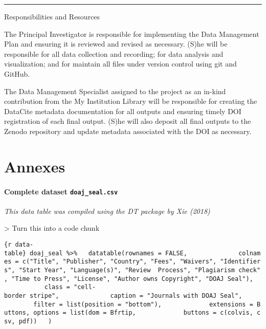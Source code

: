 \documentclass[]{article}
\let\oldparagraph\paragraph
\renewcommand{\paragraph}[1]{\oldparagraph{#1}\mbox{}}
\begin{document}
\begin{center}\rule{0.5\linewidth}{\linethickness}\end{center}

Responsibilities and Resources

The Principal Investigator is responsible for implementing the Data
Management Plan and ensuring it is reviewed and revised as necessary.
(S)he will be responsible for all data collection and recording; for
data analysis and visualization; and for maintain all files under
version control using git and GitHub.

The Data Management Specialist assigned to the project as an in-kind
contribution from the My Institution Library will be responsible for
creating the DataCite metadata documentation for all outputs and
ensuring timely DOI registration of each final output. (S)he will also
deposit all final outputs to the Zenodo repository and update metadata
associated with the DOI as necessary.

\section*{Annexes}\label{annexes}

\hypertarget{annex-table}{\paragraph{\texorpdfstring{Complete dataset
\texttt{doaj\_seal.csv}}{Complete dataset doaj\_seal.csv}}\label{annex-table}}

\emph{This data table was compiled using the DT package by Xie (2018)}

\textbar{}\textbar{}\textgreater{} Turn this into a code chunk

\texttt{\{r\ data-table\}\ doaj\_seal\ \%\textgreater{}\%\ \ \ datatable(rownames\ =\ FALSE,\ \ \ \ \ \ \ \ \ \ \ \ \ \ colnames\ =\ c("Title",\ "Publisher",\ "Country",\ "Fees",\ "Waivers",\ "Identifiers",\ "Start\ Year",\ "Language(s)",\ "Review\ \ Process",\ "Plagiarism\ check",\ "Time\ to\ Press",\ "License",\ "Author\ owns\ Copyright",\ "DOAJ\ Seal"),\ \ \ \ \ \ \ \ \ \ \ \ \ class\ =\ "cell-border\ stripe",\ \ \ \ \ \ \ \ \ \ \ \ \ \ caption\ =\ "Journals\ with\ DOAJ\ Seal",\ \ \ \ \ \ \ \ \ \ \ \ \ filter\ =\ list(position\ =\ "bottom"),\ \ \ \ \ \ \ \ \ \ \ \ \ extensions\ =\ \textquotesingle{}Buttons\textquotesingle{},\ options\ =\ list(dom\ =\ \textquotesingle{}Bfrtip\textquotesingle{},\ \ \ \ \ \ \ \ \ \ \ \ \ buttons\ =\ c(\textquotesingle{}colvis\textquotesingle{},\ \textquotesingle{}csv\textquotesingle{},\ \textquotesingle{}pdf\textquotesingle{}))\ \ \ )}
\end{document}
